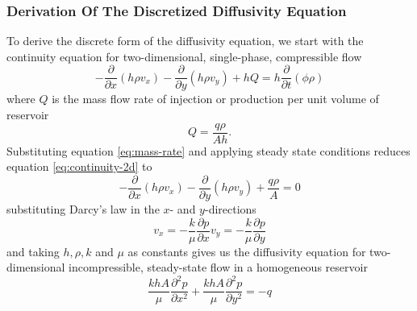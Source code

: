 \subsubsection{Derivation Of The Discretized Diffusivity Equation} %
\label{ssub:derivation}
To derive the discrete form of the diffusivity equation, we  start with the continuity equation for two-dimensional, single-phase, compressible flow \cite{Peaceman1977Fundamentals}
\begin{equation}
    \label{eq:continuity-2d}
    - \frac{\partial}{\partial x} \left( h\rho v_x \right) - \frac{\partial}{\partial y} \left( h\rho v_y \right) + hQ = h \frac{\partial }{\partial t} \left( \phi \rho \right)
\end{equation}
where $Q$ is the mass flow rate of injection or production per unit volume of reservoir
\begin{equation}
    \label{eq:mass-rate}
    Q = \frac{q\rho}{Ah}.
\end{equation}
Substituting equation \eqref{eq:mass-rate} and applying steady state conditions reduces equation \eqref{eq:continuity-2d} to
\begin{equation}
    - \frac{\partial}{\partial x} \left( h\rho v_x \right) - \frac{\partial}{\partial y} \left( h\rho v_y \right) + \frac{q\rho}{A} = 0
\end{equation}
substituting Darcy's law in the $x$- and $y$-directions \cite{Peaceman1977Fundamentals}
\begin{subequations}
    \begin{equation}
        v_x = -\frac{k}{\mu} \frac{\partial p}{\partial x}
    \end{equation}
    \begin{equation}
        v_y = -\frac{k}{\mu} \frac{\partial p}{\partial y}
    \end{equation}
\end{subequations}
and taking $h,\rho,k$ and $\mu$ as constants gives us the diffusivity equation for two-dimensional incompressible, steady-state flow in a homogeneous reservoir
\begin{equation}
    \label{eq:differential-flow}
    \frac{khA}{\mu} \frac{\partial^2 p}{\partial x^2}  + \frac{khA}{\mu} \frac{\partial^2 p}{\partial y^2} = -q
\end{equation}

